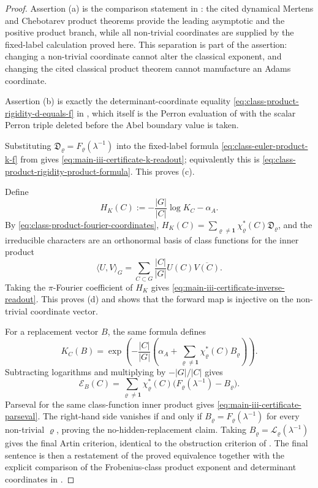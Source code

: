 \documentclass[11pt,a4paper]{amsart}
\theoremstyle{plain}
\theoremstyle{definition}
\theoremstyle{remark}
\begin{document}
\begin{proof}
  Assertion \textup{(a)} is the comparison statement in
  : the cited dynamical Mertens and
  Chebotarev product theorems provide the leading asymptotic and the positive
  product branch, while all non-trivial coordinates are supplied by the
  fixed-label calculation proved here.  This separation is part of the assertion: changing
  a non-trivial coordinate cannot alter the classical exponent, and changing
  the cited classical product theorem cannot manufacture an Adams coordinate.

  Assertion \textup{(b)} is exactly the determinant-coordinate equality
  \eqref{eq:class-product-rigidity-d-equals-f} in
  , which itself is the Perron
  evaluation of  with the scalar
  Perron triple deleted before the Abel boundary value is taken.

  Substituting \(\mathfrak D_\varrho=F_\varrho(\lambda^{-1})\) into the
  fixed-label formula \eqref{eq:class-euler-product-k-f} from
   gives
  \eqref{eq:main-iii-certificate-k-readout}; equivalently this is
  \eqref{eq:class-product-rigidity-product-formula}.  This proves
  \textup{(c)}.

  Define
  \[
    H_K(C):=-\frac{|G|}{|C|}\log K_C-\alpha_A .
  \]
  By \eqref{eq:class-product-fourier-coordinates},
  \(H_K(C)=\sum_{\varrho\neq\mathbf1}\chi_\varrho^\ast(C)\mathfrak D_\varrho\),
  and the irreducible characters are an orthonormal basis of class functions
  for the inner product
  \[
    \langle U,V\rangle_G
    =
    \sum_{C\subset G}\frac{|C|}{|G|}U(C)\overline{V(C)} .
  \]
  Taking the \(\pi\)-Fourier coefficient of \(H_K\) gives
  \eqref{eq:main-iii-certificate-inverse-readout}.  This proves
  \textup{(d)} and shows that the forward map is injective on the
  non-trivial coordinate vector.

  For a replacement vector \(B\), the same formula defines
  \[
    K_C(B)=
    \exp\!\left(
      -\frac{|C|}{|G|}
      \left(
        \alpha_A+
        \sum_{\varrho\neq\mathbf1}
          \chi_\varrho^\ast(C)B_\varrho
      \right)
    \right).
  \]
  Subtracting logarithms and multiplying by \(-|G|/|C|\) gives
  \[
    \mathscr E_B(C)=
    \sum_{\varrho\neq\mathbf1}
      \chi_\varrho^\ast(C)
      \bigl(F_\varrho(\lambda^{-1})-B_\varrho\bigr).
  \]
  Parseval for the same class-function inner product gives
  \eqref{eq:main-iii-certificate-parseval}.  The right-hand side vanishes if
  and only if \(B_\varrho=F_\varrho(\lambda^{-1})\) for every non-trivial
  \(\varrho\), proving the no-hidden-replacement claim.  Taking
  \(B_\varrho=\mathcal L_\varrho(\lambda^{-1})\) gives the final Artin
  criterion, identical to the obstruction criterion of
  .  The final sentence is then a
  restatement of the proved equivalence together with the explicit comparison
  of the Frobenius-class product exponent and determinant coordinates in
  .


\end{proof}
\end{document}
